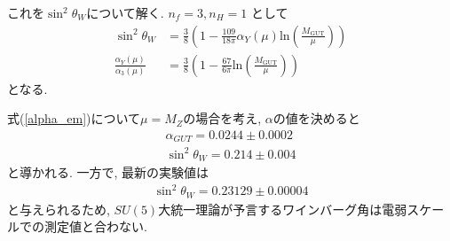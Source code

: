 これを$\sin^2\theta_W$について解く.
$n_f =3, n_H = 1$ として
\begin{align}
  \sin^2{\theta_W} &= \frac{3}{8}\left( 1 - \frac{109}{18\pi}\alpha_{Y}(\mu)\mathrm{ln}\left(\frac{M_{\mathrm{GUT}}}{\mu}\right) \right)\nonumber\\
  \frac{\alpha_{Y}{(\mu)}}{\alpha_{3}{(\mu)}} &= \frac{3}{8}\left( 1 - \frac{67}{6\pi} \mathrm{ln}\left(\frac{M_{\mathrm{GUT}}}{\mu}\right)\right)\label{alpha_em}
\end{align}
となる.

式(\ref{alpha_em})について$\mu=M_Z$の場合を考え, $\alpha$の値を決めると
\begin{align}
  \alpha_{GUT} = 0.0244\pm 0.0002\nonumber\\
  \sin^2 \theta_W = 0.214\pm 0.004\nonumber
\end{align}
と導かれる. \cite{}
一方で, 最新の実験値は
\begin{align}
  \sin^2\theta_W = 0.23129\pm0.00004
\end{align}
と与えられるため, $SU(5)$大統一理論が予言するワインバーグ角は電弱スケールでの測定値と合わない.

